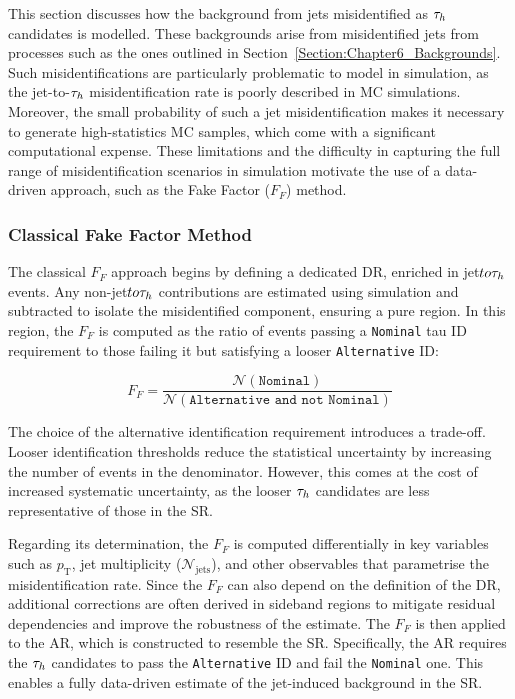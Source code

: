 \label{Section:Chapter6_JetToTauBackground}

This section discusses how the background from jets misidentified as $\tau_h$ candidates is modelled. These backgrounds arise from misidentified jets from processes such as the ones outlined in Section~\ref{Section:Chapter6_Backgrounds}. Such misidentifications are particularly problematic to model in simulation, as the jet-to-$\tau_h$ misidentification rate is poorly described in \ac{MC} simulations. Moreover, the small probability of such a jet misidentification makes it necessary to generate high-statistics \ac{MC} samples, which come with a significant computational expense. These limitations and the difficulty in capturing the full range of misidentification scenarios in simulation motivate the use of a data-driven approach, such as the Fake Factor ($F_F$) method.

\subsubsection{Classical Fake Factor Method}
\label{Section:Chapter6_FakeFactors_Classical}

The classical $F_F$ approach begins by defining a dedicated \ac{DR}, enriched in jet$to\tau_h$ events. Any non-jet$to\tau_h$ contributions are estimated using simulation and subtracted to isolate the misidentified component, ensuring a pure region. In this region, the $F_F$ is computed as the ratio of events passing a \texttt{Nominal} tau ID requirement to those failing it but satisfying a looser \texttt{Alternative} ID:

\begin{equation}
F_F = \frac{\mathcal{N}(\texttt{Nominal})}{\mathcal{N}(\texttt{Alternative and not Nominal})}
\end{equation}

The choice of the alternative identification requirement introduces a trade-off. Looser identification thresholds reduce the statistical uncertainty by increasing the number of events in the denominator. However, this comes at the cost of increased systematic uncertainty, as the looser $\tau_h$ candidates are less representative of those in the \ac{SR}. 

Regarding its determination, the $F_F$ is computed differentially in key variables such as $p_\text{T}$, jet multiplicity ($\mathcal{N}_{\text{jets}}$), and other observables that parametrise the misidentification rate. Since the $F_F$ can also depend on the definition of the \ac{DR}, additional corrections are often derived in sideband regions to mitigate residual dependencies and improve the robustness of the estimate. The $F_F$ is then applied to the \ac{AR}, which is constructed to resemble the \ac{SR}. Specifically, the \ac{AR} requires the $\tau_h$ candidates to pass the \texttt{Alternative} ID and fail the \texttt{Nominal} one. This enables a fully data-driven estimate of the jet-induced background in the \ac{SR}.

